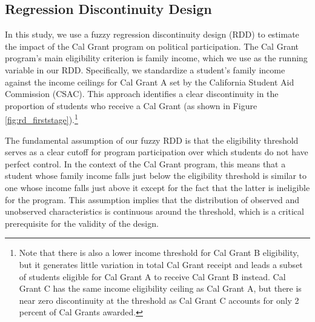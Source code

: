 \documentclass[12pt,letterpaper,oneside]{book}
\begin{document}
    \subsection{Regression Discontinuity Design}\label{sec:RDD}

In this study, we use a fuzzy regression discontinuity design (RDD) to estimate the impact of the Cal Grant program on political participation. The Cal Grant program's main eligibility criterion is family income, which we use as the running variable in our RDD. Specifically, we standardize a student's family income against the income ceilings for Cal Grant A set by the California Student Aid Commission (CSAC). This approach identifies a clear discontinuity in the proportion of students who receive a Cal Grant (as shown in Figure \ref{fig:rd_firststage}).\footnote{Note that there is also a lower income threshold for Cal Grant B eligibility, but it generates little variation in total Cal Grant receipt and leads a subset of students eligible for Cal Grant A to receive Cal Grant B instead. Cal Grant C has the same income eligibility ceiling as Cal Grant A, but there is near zero discontinuity at the threshold as Cal Grant C accounts for only 2 percent of Cal Grants awarded.}

The fundamental assumption of our fuzzy RDD is that the eligibility threshold serves as a clear cutoff for program participation over which students do not have perfect control. In the context of the Cal Grant program, this means that a student whose family income falls just below the eligibility threshold is similar to one whose income falls just above it except for the fact that the latter is ineligible for the program. This assumption implies that the distribution of observed and unobserved characteristics is continuous around the threshold, which is a critical prerequisite for the validity of the design.
\end{document}
